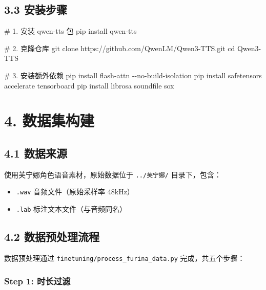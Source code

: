 \documentclass[
  english,
  letterpaper,
  DIV=11,
  numbers=noendperiod]{scrartcl}
\newenvironment{Shaded}{\begin{snugshade}}{\end{snugshade}}
\newcommand{\AttributeTok}[1]{\textcolor[rgb]{0.40,0.45,0.13}{#1}}
\newcommand{\BuiltInTok}[1]{\textcolor[rgb]{0.00,0.23,0.31}{#1}}
\newcommand{\CommentTok}[1]{\textcolor[rgb]{0.37,0.37,0.37}{#1}}
\newcommand{\ExtensionTok}[1]{\textcolor[rgb]{0.00,0.23,0.31}{#1}}
\newcommand{\FunctionTok}[1]{\textcolor[rgb]{0.28,0.35,0.67}{#1}}
\newcommand{\NormalTok}[1]{\textcolor[rgb]{0.00,0.23,0.31}{#1}}
\providecommand{\tightlist}{%
  \setlength{\itemsep}{0pt}\setlength{\parskip}{0pt}}
\begin{document}
\subsection{3.3 安装步骤}\label{ux5b89ux88c5ux6b65ux9aa4}

\begin{Shaded}
\begin{Highlighting}[]
\CommentTok{\# 1. 安装 qwen{-}tts 包}
\ExtensionTok{pip}\NormalTok{ install qwen{-}tts}

\CommentTok{\# 2. 克隆仓库}
\FunctionTok{git}\NormalTok{ clone https://github.com/QwenLM/Qwen3{-}TTS.git}
\BuiltInTok{cd}\NormalTok{ Qwen3{-}TTS}

\CommentTok{\# 3. 安装额外依赖}
\ExtensionTok{pip}\NormalTok{ install flash{-}attn }\AttributeTok{{-}{-}no{-}build{-}isolation}
\ExtensionTok{pip}\NormalTok{ install safetensors accelerate tensorboard}
\ExtensionTok{pip}\NormalTok{ install librosa soundfile sox}
\end{Highlighting}
\end{Shaded}

\section{4. 数据集构建}\label{sec-dataset}

\subsection{4.1 数据来源}\label{ux6570ux636eux6765ux6e90}

使用芙宁娜角色语音素材，原始数据位于 \texttt{../芙宁娜/} 目录下，包含：

\begin{itemize}
\tightlist
\item
  \texttt{.wav} 音频文件（原始采样率 48kHz）
\item
  \texttt{.lab} 标注文本文件（与音频同名）
\end{itemize}

\subsection{4.2
数据预处理流程}\label{ux6570ux636eux9884ux5904ux7406ux6d41ux7a0b}

数据预处理通过 \texttt{finetuning/process\_furina\_data.py}
完成，共五个步骤：

\subsubsection{Step 1: 时长过滤}\label{step-1-ux65f6ux957fux8fc7ux6ee4}
\end{document}
